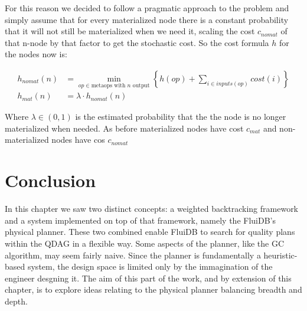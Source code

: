 For this reason we decided to follow a pragmatic approach to the
problem and simply assume that for every materialized node there is a
constant probability that it will not still be materialized when we
need it, scaling the cost \(c_{nomat}\) of that n-node by that factor
to get the stochastic cost. So the cost formula \(h\) for the nodes
now is:

\begin{align*}
  h_{nomat}(n) &= \min\limits_{op \in \text{metaops with \(n\) output}} \left\{ h(op) + \sum\limits_{i \in inputs(op)} cost(i)  \right\} \\
  h_{mat}(n) &= \lambda \cdot h_{nomat}(n)
\end{align*}

Where \(\lambda \in (0,1)\) is the estimated probability that the the
node is no longer materialized when needed. As before materialized
nodes have cost \(c_{mat}\) and non-materialized nodes have cos
\(c_{nomat}\)

\section{Conclusion}

In this chapter we saw two distinct concepts: a weighted backtracking
framework and a system implemented on top of that framework, namely
the FluiDB's physical planner. These two combined enable FluiDB to
search for quality plans within the QDAG in a flexible way. Some
aspects of the planner, like the GC algorithm, may seem fairly
naive. Since the planner is fundamentally a heuristic-based system,
the design space is limited only by the immagination of the engineer
desgning it. The aim of this part of the work, and by extension of
this chapter, is to explore ideas relating to the physical planner
balancing breadth and depth.
